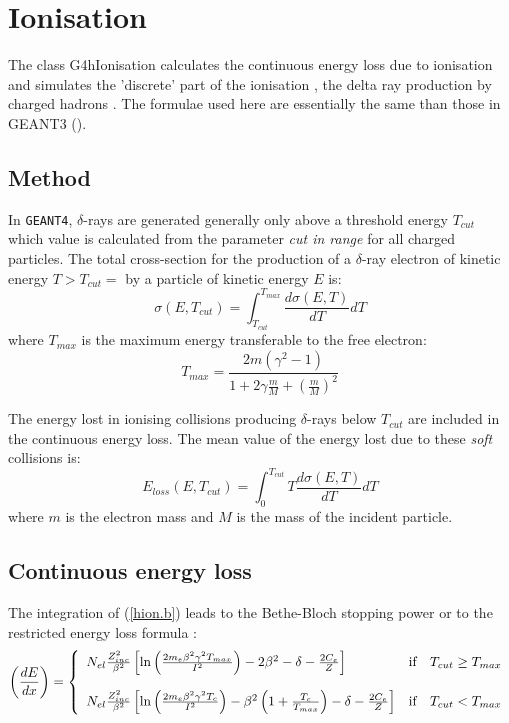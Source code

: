 \chapter[Ionisation]{Ionisation}
 

 The class G4hIonisation calculates the continuous energy loss
  due to ionisation and
 simulates the 'discrete' part of the ionisation , 
the delta ray production by charged hadrons . The formulae used here
 are essentially the same than those in GEANT3 (\cite{hion.geant3}).

\section{Method}

In {\tt GEANT4}, $\delta$-rays are generated generally 
only above a threshold energy
$T_{cut}$ which value is calculated from the parameter {\em cut in range}
for all  charged particles. The total cross-section
for the production of a $\delta$-ray electron of kinetic
energy $T > T_{cut}=$ by a particle of kinetic energy $E$
is:
\begin{equation}
\label{hion.a}
\sigma (E,T_{cut}) = \int_{T_{cut}}^{T_{max}} \frac{d \sigma (E,T)}{dT} dT
\end{equation}
where $T_{max}$ is the maximum energy transferable to the free electron:
\begin{equation}
T_{max} =\frac{2m(\gamma^2 -1)}
      {1+2\gamma\frac{m}{M}+
      \left(\frac{m}{M} \right)^2 }
\end{equation}

The energy lost in
ionising collisions producing $\delta$-rays below ${T_{cut}}$
are included in the continuous energy loss. The mean value of the
energy lost due to these {\it soft} collisions is:
\begin{equation}
\label{hion.b}
E_{loss}(E,T_{cut}) = \int_{0}^{T_{cut}}
T \frac{d \sigma (E,T)} {dT} dT
\end{equation}
where $m$ is the electron mass and $M$ is the mass of the incident particle.

\section{Continuous energy loss}
The integration of (\ref{hion.b}) leads to the Bethe-Bloch
stopping power or to the restricted energy
loss formula \cite{hion.pdgb}:
\begin{equation}
\label{hion.c}
 \left(\frac{dE}{dx} \right) =
\left \{
\begin{array}{lcl}
 N_{el} \frac{ Z_{inc}^{2}}{\beta^{2}} \left [
\ln \left (
\frac{2 m_{e} \beta^{2} \gamma^{2} T_{max} }{I^{2}}
\right ) - 2 \beta^{2} -
\delta -
\frac{ 2 C_{e}}{Z} \right ]
\hfill & \mbox{if} & T_{cut} \geq T_{max} \\ [0.5cm]
 N_{el} \frac{ Z_{inc}^{2}}{ \beta^{2}} \left [
\ln \left (
\frac{ 2 m_{e} \beta^{2} \gamma^{2} T_{c} }{I^{2}}
\right ) -
\beta^{2} \left ( 1 + \frac{T_{c}}{T_{max}} \right )
 - \delta
-\frac{2 C_{e}}{Z} \right ] \hfill & \mbox{if} & T_{cut} < T_{max}
\end{array}
\right .
\end{equation}

